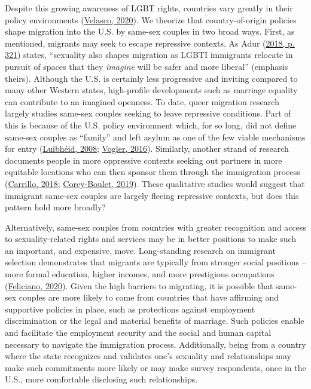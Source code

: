\documentclass[
  11pt,
]{article}
\begin{document}
Despite this growing awareness of LGBT rights, countries vary greatly in their policy environments (\protect\hyperlink{ref-velasco_2020}{Velasco, 2020}). We theorize that country-of-origin policies shape migration into the U.S. by same-sex couples in two broad ways. First, as mentioned, migrants may seek to escape repressive contexts. As Adur (\protect\hyperlink{ref-adur_2018}{2018, p. 321}) states, ``sexuality also shapes migration as LGBTI immigrants relocate in pursuit of spaces that they \emph{imagine} will be safer and more liberal'' (emphasis theirs). Although the U.S. is certainly less progressive and inviting compared to many other Western states, high-profile developments such as marriage equality can contribute to an imagined openness. To date, queer migration research largely studies same-sex couples seeking to leave repressive conditions. Part of this is because of the U.S. policy environment which, for so long, did not define same-sex couples as ``family'' and left asylum as one of the few viable mechanisms for entry (\protect\hyperlink{ref-luibheid_2008}{Luibhéid, 2008}; \protect\hyperlink{ref-vogler_2016}{Vogler, 2016}). Similarly, another strand of research documents people in more oppressive contexts seeking out partners in more equitable locations who can then sponsor them through the immigration process (\protect\hyperlink{ref-carrillo_2018}{Carrillo, 2018}; \protect\hyperlink{ref-corey-boulet_2019}{Corey-Boulet, 2019}). These qualitative studies would suggest that immigrant same-sex couples are largely fleeing repressive contexts, but does this pattern hold more broadly?

Alternatively, same-sex couples from countries with greater recognition and access to sexuality-related rights and services may be in better positions to make such an important, and expensive, move. Long-standing research on immigrant selection demonstrates that migrants are typically from stronger social positions -- more formal education, higher incomes, and more prestigious occupations (\protect\hyperlink{ref-feliciano_2020}{Feliciano, 2020}). Given the high barriers to migrating, it is possible that same-sex couples are more likely to come from countries that have affirming and supportive policies in place, such as protections against employment discrimination or the legal and material benefits of marriage. Such policies enable and facilitate the employment security and the social and human capital necessary to navigate the immigration process. Additionally, being from a country where the state recognizes and validates one's sexuality and relationships may make such commitments more likely or may make survey respondents, once in the U.S., more comfortable disclosing such relationships.
\end{document}
